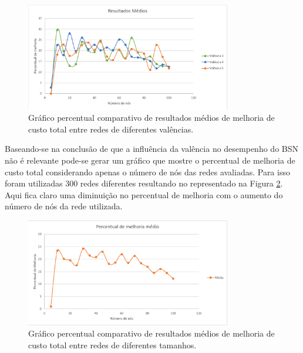 \begin{figure} [ht]%
	\centering
	\includegraphics[width=0.8\textwidth]{./figuras/BSN-resultados-medios.png} %
	\caption[Melhoria de custo x valência]{Gráfico percentual comparativo de resultados médios de melhoria de custo total entre redes de diferentes valências.}
	\label{fig_graph_bsn_medio}
\end{figure}

Baseando-se na conclusão de que a influência da valência no desempenho do BSN não é relevante pode-se gerar um gráfico que mostre o percentual de melhoria de custo total considerando apenas o número de nós das redes avaliadas. Para isso foram utilizadas 300 redes diferentes resultando no representado na Figura \ref{fig_graph_bsn_medio_all}. Aqui fica claro uma diminuição no percentual de melhoria com o aumento do número de nós da rede utilizada. 

\begin{figure} [ht]%
	\centering
	\includegraphics[width=0.8\textwidth]{./figuras/BSN-resultados-medios-all.png} %
	\caption[Melhoria de custo x tamanho de rede]{Gráfico percentual comparativo de resultados médios de melhoria de custo total entre redes de diferentes tamanhos.}
	\label{fig_graph_bsn_medio_all}
\end{figure}

